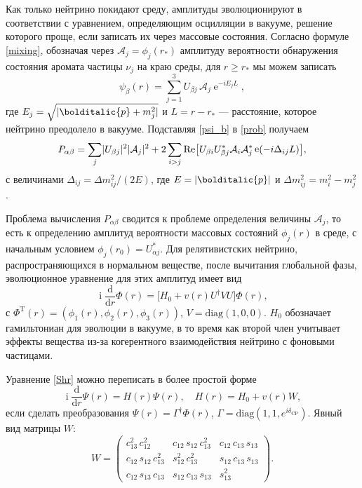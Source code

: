 \documentclass[12pt]{article}
\newcommand\Vect[1]{\bolditalic{#1}}
\DeclareMathOperator{\Exp}{e}
\DeclareMathOperator\Iunit{i}
\DeclarePairedDelimiter{\abs}{\lvert}{\rvert}
\renewcommand\exp\Exp
\renewcommand\imath\Iunit
\begin{document}
Как только нейтрино покидают среду, амплитуды эволюционируют в соответствии с
уравнением, определяющим осцилляции в вакууме, решение которого проще, если
записать их через массовые состояния. Согласно формуле \eqref{mixing}, обозначая
через $\mathcal{A}_j=\phi_j(r_*)$ амплитуду вероятности обнаружения состояния
аромата частицы $\nu_j$ на краю среды, для $r \geqslant r_*$ мы можем записать
\begin{equation}\label{psi_b}
  \psi_\beta(r)=\sum_{j=1}^3 U_{\beta j}\, \mathcal{A}_j \exp^{-iE_jL},
\end{equation}
где $E_j=\sqrt{\abs{\Vect{p} + m^2_j}}$ и $L=r-r_*$ — расстояние, которое нейтрино
преодолело в вакууме. Подставляя \eqref{psi_b} в \eqref{prob} получаем
\begin{equation}
  P_{\alpha\beta}=\sum_j \abs{U_{\beta j}}^2\abs{\mathcal{A}_j}^2+
  2\sum_{i>j}\text{Re}\big[U_{\beta i}U^*_{\beta j}\mathcal{A}_i
  \mathcal{A}^*_j\exp(-i\Delta_{ij}L)\big],
\end{equation}
с величинами $\Delta_{ij}=\Delta m^2_{ij}/(2E)$, где $E=\abs{\Vect{p}}$ и
$\Delta m^2_{ij} \!= m^2_{i} - m^2_{j}$.

Проблема вычисления $P_{\alpha\beta}$ сводится к проблеме определения величины
$\mathcal{A}_j$, то есть к определению амплитуд вероятности массовых состояний
$\phi_j(r)$ в среде, с начальным условием $\phi_j(r_0)=U^*_{\alpha j}$. Для
релятивистских нейтрино, распространяющихся в нормальном веществе, после
вычитания глобальной фазы, эволюционное уравнение для этих амплитуд имеет вид
\begin{equation}\label{Shr}
  \imath\frac{\text{d}}{\text{d}r} \Phi(r)=
  \big[H_0+v(r)U^\dagger V U\big] \Phi(r),
\end{equation}
с $\Phi^{\text{T}}(r)=(\phi_1(r),\phi_2(r),\phi_3(r))$, $V=\text{diag}(1,0,0)$.
$H_0$ обозначает гамильтониан для эволюции в вакууме, в то время как второй член
учитывает эффекты вещества из-за когерентного взаимодействия нейтрино с фоновыми
частицами.

Уравнение \eqref{Shr} можно переписать в более простой форме
\begin{equation}\label{eq:1}
  \imath\frac{\text{d}}{\text{d}r}\Psi(r)=H(r)\Psi(r),\quad
  H(r)=H_0 + v(r)W,
\end{equation}
если сделать преобразования $\Psi(r)=\Gamma^\dagger\Phi(r)$,
$\Gamma=\text{diag}(1,1,e^{i\delta_{\text{CP}}})$. Явный вид матрицы $W$:
\begin{equation}\label{W}
  W=
  \begin{pmatrix}
    c^2_{13}\, c^2_{12}& c_{12}\, s_{12}\, c^2_{13}& c_{12}\, c_{13}\, s_{13}\\
    c_{12}\, s_{12}\, c^2_{13}& s^2_{12}\, c^2_{13}& s_{12}\, c_{13}\, s_{13}\\
    c_{12}\, s_{13}\, c_{13}& s_{12}\, c_{13}\, s_{13}& s^2_{13}
  \end{pmatrix}.
\end{equation}
\end{document}
